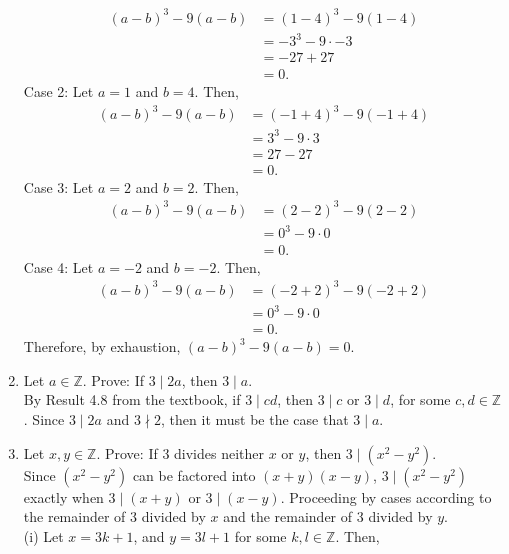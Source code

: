 \documentclass[12pt]{article}
\newcommand{\Z}{\mathbb{Z}}
\begin{document}
\begin{enumerate}
\begin{equation*}
            \begin{split}
                (a-b)^3-9(a-b)&=(1-4)^3-9(1-4)\\
                &=-3^3-9\cdot-3\\
                &=-27+27\\
                &=0.
            \end{split}
        \end{equation*}
        Case 2: Let \(a=1\) and \(b=4\). Then, \begin{equation*}
            \begin{split}
                (a-b)^3-9(a-b)&=(-1+4)^3-9(-1+4)\\
                &=3^3-9\cdot3\\
                &=27-27\\
                &=0.
            \end{split}
        \end{equation*}
        Case 3: Let \(a=2\) and \(b=2\). Then, \begin{equation*}
            \begin{split}
                (a-b)^3-9(a-b)&=(2-2)^3-9(2-2)\\
                &=0^3-9\cdot 0\\
                &=0.
            \end{split}
        \end{equation*}
        Case 4: Let \(a=-2\) and \(b=-2\). Then, \begin{equation*}
            \begin{split}
                (a-b)^3-9(a-b)&=(-2+2)^3-9(-2+2)\\
                &=0^3-9\cdot 0\\
                &=0.
            \end{split}
        \end{equation*}
        Therefore, by exhaustion, \((a-b)^3-9(a-b)=0\).
        \item Let \(a\in\Z\). Prove: If \(3 \mid 2a\), then \(3\mid a\).\\ By Result 4.8 from the textbook, if \(3\mid cd\), then \(3\mid c\) or \(3\mid d\), for some \(c, d\in\Z\). Since \(3\mid 2a\) and \(3\nmid 2\), then it must be the case that \(3\mid a\).
        \item Let \(x,y\in\Z\). Prove: If 3 divides neither \(x\) or \(y\), then \(3\mid (x^2-y^2)\).\\ Since \((x^2-y^2)\) can be factored into \((x+y)(x-y)\), \(3\mid(x^2-y^2)\) exactly when \(3\mid(x+y)\) or \(3\mid(x-y)\). Proceeding by cases according to the remainder of 3 divided by \(x\) and the remainder of 3 divided by \(y\). \\  (i) Let \(x=3k+1\), and \(y=3l+1\) for some \(k,l\in\Z\). Then,

\end{enumerate}
\end{document}
